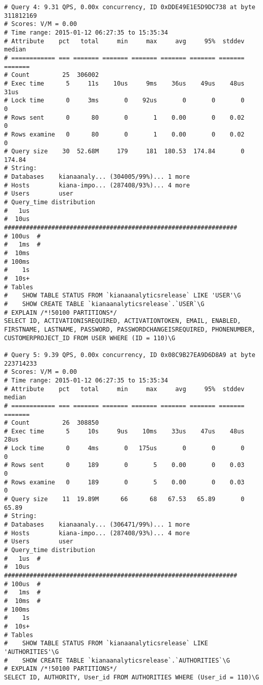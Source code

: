 \begin{appendix}
\begin{footnotesize}
\begin{verbatim}
# Query 4: 9.31 QPS, 0.00x concurrency, ID 0xDDE49E1E5D9DC738 at byte 311812169
# Scores: V/M = 0.00
# Time range: 2015-01-12 06:27:35 to 15:35:34
# Attribute    pct   total     min     max     avg     95%  stddev  median
# ============ === ======= ======= ======= ======= ======= ======= =======
# Count         25  306002
# Exec time      5     11s    10us     9ms    36us    49us    48us    31us
# Lock time      0     3ms       0    92us       0       0       0       0
# Rows sent      0      80       0       1    0.00       0    0.02       0
# Rows examine   0      80       0       1    0.00       0    0.02       0
# Query size    30  52.68M     179     181  180.53  174.84       0  174.84
# String:
# Databases    kianaanaly... (304005/99%)... 1 more
# Hosts        kiana-impo... (287408/93%)... 4 more
# Users        user
# Query_time distribution
#   1us
#  10us  ################################################################
# 100us  #
#   1ms  #
#  10ms
# 100ms
#    1s
#  10s+
# Tables
#    SHOW TABLE STATUS FROM `kianaanalyticsrelease` LIKE 'USER'\G
#    SHOW CREATE TABLE `kianaanalyticsrelease`.`USER`\G
# EXPLAIN /*!50100 PARTITIONS*/
SELECT ID, ACTIVATIONISREQUIRED, ACTIVATIONTOKEN, EMAIL, ENABLED, FIRSTNAME, LASTNAME, PASSWORD, PASSWORDCHANGEISREQUIRED, PHONENUMBER, CUSTOMERPROJECT_ID FROM USER WHERE (ID = 110)\G

# Query 5: 9.39 QPS, 0.00x concurrency, ID 0x08C9B27EA9D6D8A9 at byte 223714233
# Scores: V/M = 0.00
# Time range: 2015-01-12 06:27:35 to 15:35:34
# Attribute    pct   total     min     max     avg     95%  stddev  median
# ============ === ======= ======= ======= ======= ======= ======= =======
# Count         26  308850
# Exec time      5     10s     9us    10ms    33us    47us    48us    28us
# Lock time      0     4ms       0   175us       0       0       0       0
# Rows sent      0     189       0       5    0.00       0    0.03       0
# Rows examine   0     189       0       5    0.00       0    0.03       0
# Query size    11  19.89M      66      68   67.53   65.89       0   65.89
# String:
# Databases    kianaanaly... (306471/99%)... 1 more
# Hosts        kiana-impo... (287408/93%)... 4 more
# Users        user
# Query_time distribution
#   1us  #
#  10us  ################################################################
# 100us  #
#   1ms  #
#  10ms  #
# 100ms
#    1s
#  10s+
# Tables
#    SHOW TABLE STATUS FROM `kianaanalyticsrelease` LIKE 'AUTHORITIES'\G
#    SHOW CREATE TABLE `kianaanalyticsrelease`.`AUTHORITIES`\G
# EXPLAIN /*!50100 PARTITIONS*/
SELECT ID, AUTHORITY, User_id FROM AUTHORITIES WHERE (User_id = 110)\G


\end{verbatim}
\end{footnotesize}
\end{appendix}
